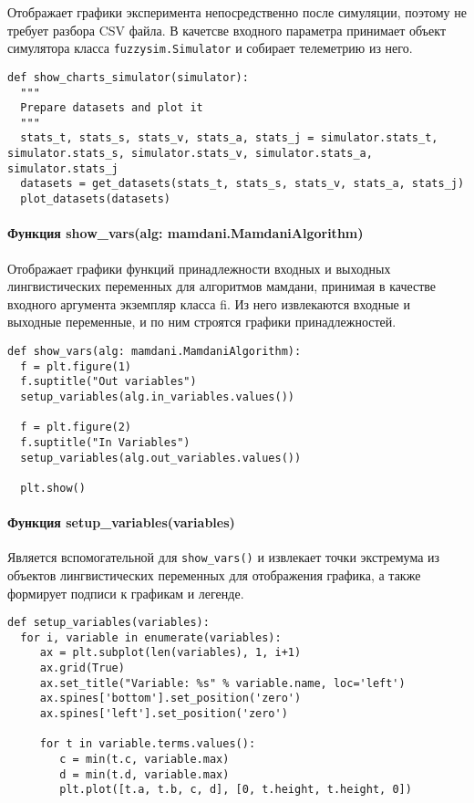 Отображает графики эксперимента непосредственно после симуляции, поэтому не требует разбора CSV файла. В качетсве входного параметра принимает объект симулятора класса \lstinline!fuzzysim.Simulator! и собирает телеметрию из него.

\begin{lstlisting}[style=pythonstyle,caption={  }, label=lst:func:1]
def show_charts_simulator(simulator):
  """
  Prepare datasets and plot it
  """
  stats_t, stats_s, stats_v, stats_a, stats_j = simulator.stats_t, simulator.stats_s, simulator.stats_v, simulator.stats_a, simulator.stats_j
  datasets = get_datasets(stats_t, stats_s, stats_v, stats_a, stats_j)
  plot_datasets(datasets)
\end{lstlisting}

\paragraph{Функция show\_vars(alg: mamdani.MamdaniAlgorithm)}

Отображает графики функций принадлежности входных и выходных лингвистических переменных для алгоритмов мамдани, принимая в качестве входного аргумента экземпляр класса fi. Из него извлекаются входные и выходные переменные, и по ним строятся графики принадлежностей.

\begin{lstlisting}[style=pythonstyle,caption={  }, label=lst:func:1]
def show_vars(alg: mamdani.MamdaniAlgorithm):
  f = plt.figure(1)
  f.suptitle("Out variables")
  setup_variables(alg.in_variables.values())

  f = plt.figure(2)
  f.suptitle("In Variables")
  setup_variables(alg.out_variables.values())

  plt.show()
\end{lstlisting}

\paragraph{Функция setup\_variables(variables)}

Является вспомогательной для \lstinline!show_vars()! и извлекает точки экстремума из объектов лингвистических переменных для отображения графика, а также формирует подписи к графикам и легенде.

\begin{lstlisting}[style=pythonstyle,caption={  }, label=lst:func:1]
def setup_variables(variables):
  for i, variable in enumerate(variables):
     ax = plt.subplot(len(variables), 1, i+1)
     ax.grid(True)
     ax.set_title("Variable: %s" % variable.name, loc='left')
     ax.spines['bottom'].set_position('zero')
     ax.spines['left'].set_position('zero')

     for t in variable.terms.values():
        c = min(t.c, variable.max)
        d = min(t.d, variable.max)
        plt.plot([t.a, t.b, c, d], [0, t.height, t.height, 0])
\end{lstlisting}


